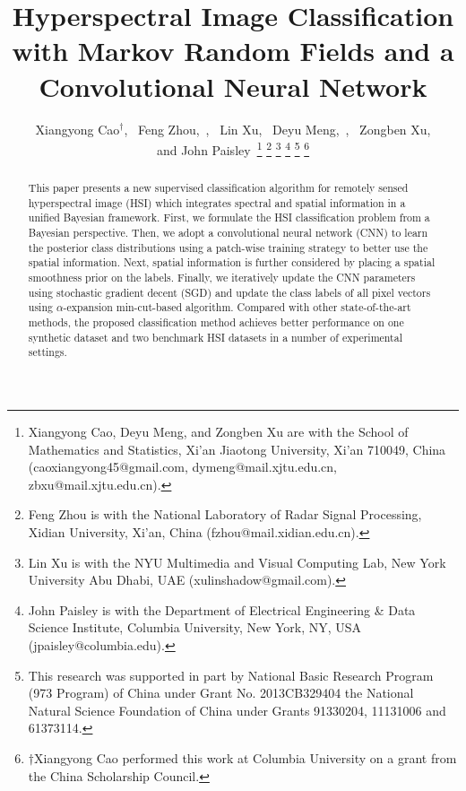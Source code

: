 \documentclass[journal]{IEEEtran}
\begin{document}
	
	\title{Hyperspectral Image {{Classification}} with Markov Random Fields and a Convolutional Neural Network}
	
	\author{Xiangyong Cao$^{\dagger}$,~
		Feng Zhou,~, ~Lin Xu, ~Deyu Meng,~, ~Zongben Xu, \\and John Paisley~\thanks{Xiangyong Cao, Deyu Meng, and Zongben Xu are with the School of Mathematics and Statistics, Xi'an Jiaotong University, Xi'an 710049, China (caoxiangyong45@gmail.com, dymeng@mail.xjtu.edu.cn, zbxu@mail.xjtu.edu.cn).} 	
		\thanks{Feng Zhou is with the National Laboratory of Radar Signal Processing, Xidian University, Xi'an, China (fzhou@mail.xidian.edu.cn).} \thanks{Lin Xu is with the NYU Multimedia and Visual Computing Lab, New York University Abu Dhabi, UAE (xulinshadow@gmail.com).}
		\thanks{John Paisley is with the Department of Electrical Engineering \& Data Science Institute, Columbia University, New York, NY, USA (jpaisley@columbia.edu).}
		\thanks{This research was supported in part by National Basic Research Program (973 Program) of China under Grant No. 2013CB329404 the National Natural Science Foundation of China under Grants 91330204, 11131006 and 61373114.}
		\thanks{$\dagger$Xiangyong Cao performed this work at Columbia University on a grant from the China Scholarship Council.}
	}
	
	
	\maketitle
	
	\begin{abstract}
		This paper presents a new supervised {{classification}} algorithm for remotely sensed hyperspectral image (HSI) which integrates spectral and spatial information in a unified Bayesian framework. First, we formulate the HSI {{classification}} problem from a Bayesian perspective. Then, we adopt a convolutional neural network (CNN) to learn the posterior class distributions using a patch-wise training strategy to better use the spatial information. Next, spatial information is further considered by placing a spatial smoothness prior on the labels. {{Finally, we iteratively update the CNN parameters using stochastic gradient decent (SGD)} and update the class labels of all pixel vectors using $\alpha$-expansion min-cut-based algorithm.} Compared with other state-of-the-art methods, the proposed {{classification}} method achieves better performance on one synthetic dataset and two benchmark HSI datasets in a number of experimental settings.
	\end{abstract}
	
\end{document}
